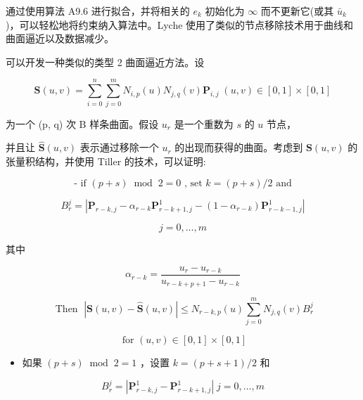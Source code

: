 \documentclass[../main.tex]{subfiles}
\begin{document}
通过使用算法 A9.6 进行拟合，并将相关的 \({e}_{k}\) 初始化为 \(\infty\) 而不更新它(或其 \({\bar{u}}_{k}\) )，可以轻松地将约束纳入算法中。Lyche \cite{Lych87,Lych88} 使用了类似的节点移除技术用于曲线和曲面逼近以及数据减少。

可以开发一种类似的类型 2 曲面逼近方法。设

\[
\mathbf{S}\left( {u,v}\right)  = \mathop{\sum }\limits_{{i = 0}}^{n}\mathop{\sum }\limits_{{j = 0}}^{m}{N}_{i,p}\left( u\right) {N}_{j,q}\left( v\right) {\mathbf{P}}_{i,j}\;\left( {u,v}\right)  \in  \left\lbrack  {0,1}\right\rbrack   \times  \left\lbrack  {0,1}\right\rbrack
\]

为一个 (p, q) 次 B 样条曲面。假设 \({u}_{r}\) 是一个重数为 \(s\) 的 \(u\) 节点，



并且让 \(\widehat{\mathbf{S}}\left( {u,v}\right)\) 表示通过移除一个 \({u}_{r}\) 的出现而获得的曲面。考虑到 \(\mathbf{S}\left( {u,v}\right)\) 的张量积结构，并使用 Tiller \cite{Till92} 的技术，可以证明:

\[
\text{ - if }\left( {p + s}\right) {\;\operatorname{mod}\;2} = 0\text{ , set }k = \left( {p + s}\right) /2\text{ and }
\]

\[
{B}_{r}^{j} = \left| {{\mathbf{P}}_{r - k,j} - {\alpha }_{r - k}{\mathbf{P}}_{r - k + 1,j}^{1} - \left( {1 - {\alpha }_{r - k}}\right) {\mathbf{P}}_{r - k - 1,j}^{1}}\right|
\]

\[
j = 0,\ldots ,m \tag{9.86}
\]

其中

\[
{\alpha }_{r - k} = \frac{{u}_{r} - {u}_{r - k}}{{u}_{r - k + p + 1} - {u}_{r - k}}
\]



\[
\text{ Then }\;\left| {\mathbf{S}\left( {u,v}\right)  - \widehat{\mathbf{S}}\left( {u,v}\right) }\right|  \leq  {N}_{r - k,p}\left( u\right) \mathop{\sum }\limits_{{j = 0}}^{m}{N}_{j,q}\left( v\right) {B}_{r}^{j}
\]

\[
\text{ for }\left( {u,v}\right)  \in  \left\lbrack  {0,1}\right\rbrack   \times  \left\lbrack  {0,1}\right\rbrack   \tag{9.87}
\]



\begin{itemize}
\item 如果 \(\left( {p + s}\right) {\;\operatorname{mod}\;2} = 1\) ，设置 \(k = \left( {p + s + 1}\right) /2\) 和
\end{itemize}

\[
{B}_{r}^{j} = \left| {{\mathbf{P}}_{r - k,j}^{1} - {\mathbf{P}}_{r - k + 1,j}^{1}}\right| \;j = 0,\ldots ,m \tag{9.88}
\]
\end{document}
